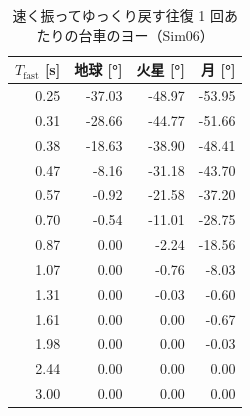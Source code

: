 \begin{longtable}{rrrr}
\caption{速く振ってゆっくり戻す往復 1 回あたりの台車のヨー（Sim06）}\\
\toprule
$T_{\text{fast}}$ [s] & 地球 [°] & 火星 [°] & 月 [°] \\ \midrule \endhead
0.25 & -37.03 & -48.97 & -53.95 \\
0.31 & -28.66 & -44.77 & -51.66 \\
0.38 & -18.63 & -38.90 & -48.41 \\
0.47 & -8.16 & -31.18 & -43.70 \\
0.57 & -0.92 & -21.58 & -37.20 \\
0.70 & -0.54 & -11.01 & -28.75 \\
0.87 & 0.00 & -2.24 & -18.56 \\
1.07 & 0.00 & -0.76 & -8.03 \\
1.31 & 0.00 & -0.03 & -0.60 \\
1.61 & 0.00 & 0.00 & -0.67 \\
1.98 & 0.00 & 0.00 & -0.03 \\
2.44 & 0.00 & 0.00 & 0.00 \\
3.00 & 0.00 & 0.00 & 0.00 \\
\bottomrule
\end{longtable}
